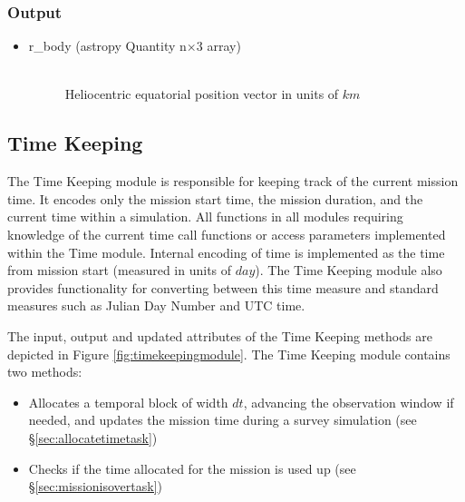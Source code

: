 \documentclass[cleanfoot]{asme2ej}
\newcommand{\reffig}[1]{Figure \ref{#1}}
\begin{document}
\subsubsection*{Output}
\begin{itemize}
\item
\begin{description}
    \item[r\_body (astropy Quantity n$\times$3 array)] \hfill \\ Heliocentric equatorial position vector in units of $ km $
\end{description}
\end{itemize}



\subsection{Time Keeping} \label{sec:timekeeping}
The Time Keeping module is responsible for keeping track of the current mission time.  It encodes only the mission start time, the mission duration, and the current time within a simulation.  All functions in all modules requiring knowledge of the current time call functions or access parameters implemented within the Time module.  Internal encoding of time is implemented as the time from mission start (measured in units of $ day $).  The Time Keeping module also provides functionality for converting between this time measure and standard measures such as Julian Day Number and UTC time.
 
The input, output and updated attributes of the Time Keeping methods are depicted in \reffig{fig:timekeepingmodule}. The Time Keeping module contains two methods:

\begin{itemize}[leftmargin=1.5in,font={\ttfamily}]
    \item[\texttt allocate\_time] Allocates a temporal block of width $dt$, advancing the observation window if needed, and updates the mission time during a survey simulation (see \S\ref{sec:allocatetimetask})
    \item[\texttt mission\_is\_over] Checks if the time allocated for the mission is used up (see \S\ref{sec:missionisovertask})
\end{itemize}
\end{document}
